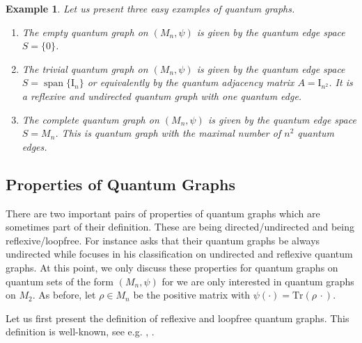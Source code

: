 \documentclass{amsart}
\newtheorem{example}[thm]{Example}
\DeclareMathOperator{\spann}{span}
\begin{document}
\begin{example}
\label{pre::example:empty_trivial_complete_qgraph}
Let us present three easy examples of quantum graphs.
\begin{enumerate}
    \item 
    The \emph{empty quantum graph} on $(M_n, \psi)$ is given by the quantum edge space $S=\{0\}$. 
    \item
    The \emph{trivial quantum graph} on $(M_n, \psi)$ is given by the quantum edge space $S = \spann \{\mathrm{I}_n\}$ or equivalently by the quantum adjacency matrix $A = \mathrm{I}_{n^2}$. It is a reflexive and undirected quantum graph with one quantum edge.
    \item 
    The \emph{complete quantum graph} on $(M_n, \psi)$ is given by the quantum edge space $S = M_n$. This is quantum graph with the maximal number of $n^2$ quantum edges.
\end{enumerate}
\end{example}



\subsection{Properties of Quantum Graphs}
\label{pre::subsec:properties_of_quantum_graphs}


There are two important pairs of properties of quantum graphs which are sometimes part of their definition. These are being directed/undirected and being reflexive/loopfree. For instance \cite{daws_quantum_2024,musto_compositional_2018} asks that their quantum graphs be always undirected while \cite{matsuda_classification_2022} focuses in his classification on undirected and reflexive quantum graphs. At this point, we only discuss these properties for quantum graphs on quantum sets of the form $(M_n, \psi)$ for we are only interested in quantum graphs on $M_2$. As before, let $\rho \in M_n$ be the positive matrix with $\psi(\cdot) = \mathrm{Tr}(\rho \, \cdot)$. 


Let us first present the definition of reflexive and loopfree quantum graphs. This definition is well-known, see e.g. \cite[Definion 2.19]{matsuda_classification_2022}, \cite[Section 1.3]{gromada_examples_2022}.
\end{document}
